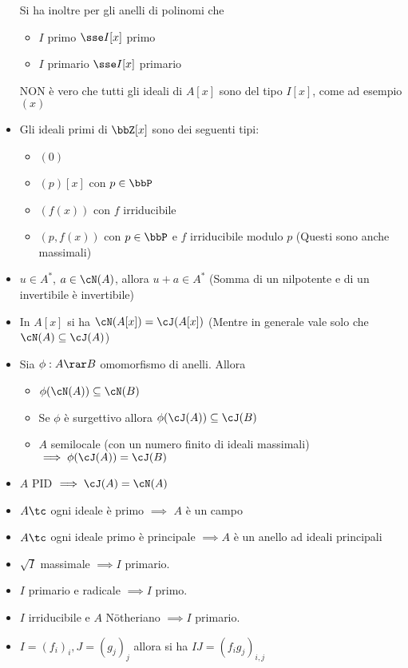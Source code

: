 \documentclass[a4paper,NoNotes,GeneralMath]{stdmdoc}
\begin{document}
\begin{itemize}
\begin{itemize}
			\end{itemize}
			Si ha inoltre per gli anelli di polinomi che
			\begin{itemize}
				\item $I$ primo $\sse I[x]$ primo
				\item $I$ primario $\sse I[x]$ primario
			\end{itemize}
			NON è vero che tutti gli ideali di $A[x]$ sono del tipo $I[x]$, come ad esempio $(x)$
		\item Gli ideali primi di $\bbZ[x]$ sono dei seguenti tipi:
			\begin{itemize}
				\item $(0)$
				\item $(p)[x]$ con $p \in \bbP$
				\item $(f(x))$ con $f$ irriducibile
				\item $(p, f(x))$ con $p \in \bbP$ e $f$ irriducibile modulo $p$ (Questi sono anche massimali)
			\end{itemize}
		\item $u \in A^*$, $a \in \cN(A)$, allora $u + a \in A^*$ (Somma di un nilpotente e di un invertibile è invertibile)
		\item In $A[x]$ si ha $\cN(A[x]) = \cJ(A[x])$ (Mentre in generale vale solo che $\cN(A) \subseteq \cJ(A)$)
		\item Sia $\phi: A \rar B$ omomorfismo di anelli. Allora
			\begin{itemize}
				\item $\phi(\cN(A)) \subseteq \cN(B)$
				\item Se $\phi$ è surgettivo allora $\phi(\cJ(A)) \subseteq \cJ(B)$
				\item $A$ semilocale (con un numero finito di ideali massimali) $\implies \phi(\cJ(A)) = \cJ(B)$
			\end{itemize}
		\item $A$ PID $\implies \cJ(A) = \cN(A)$
		\item $A \tc$ ogni ideale è primo $\implies$ $A$ è un campo
		\item $A \tc$ ogni ideale primo è principale $\implies A$ è un anello ad ideali principali
		\item $\sqrt{I}$ massimale $\implies I$ primario.
		\item $I$ primario e radicale $\implies I$ primo.
		\item $I$ irriducibile e $A$ Nötheriano $\implies I$ primario.
		\item $I = (f_i)_i, J = (g_j)_j$ allora si ha $IJ = (f_ig_j)_{i,j}$

\end{itemize}
\end{document}
